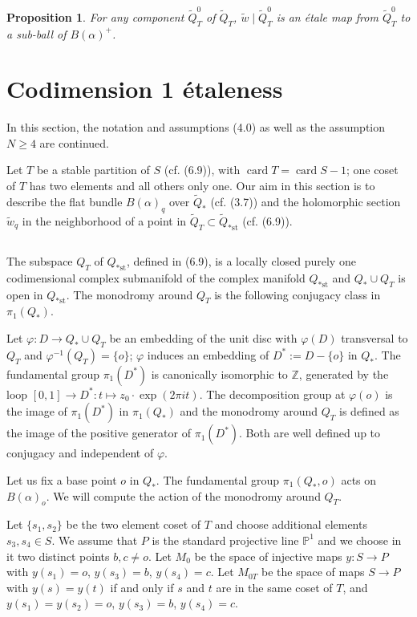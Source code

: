 \documentclass[12pt,a4paper]{article}
\theoremstyle{plain}
\newtheorem{proposition}[theorem]{Proposition}
\theoremstyle{definition}
\theoremstyle{remark}
\DeclareMathOperator{\card}{card}
\begin{document}
\begin{proposition}
\label{8.9}
For any component $\widetilde{Q}_T^0$ of $\widetilde{Q}_T$, $\widetilde{w} \mid \widetilde{Q}_T^0$ is an \'etale map from $\widetilde{Q}_T^0$ to a sub-ball of $B(\alpha)^+$.
\end{proposition}

\section{Codimension 1 \'etaleness}
\label{sec:9}

In this section, the notation and assumptions (4.0) as well as the assumption $N \geqslant 4$ are continued.

Let $T$ be a stable partition of $S$ (cf. (6.9)), with $\card T = \card S - 1$; one coset of $T$ has two elements and all others only one. Our aim in this section is to describe the flat bundle $B(\alpha)_q$ over $\widetilde{Q}_*$ (cf. (3.7)) and the holomorphic section $\widetilde{w}_q$ in the neighborhood of a point in $\widetilde{Q}_T \subset \widetilde{Q}_{*\text{st}}$ (cf. (6.9)).

\subsection{}
\label{9.1}

The subspace $Q_T$ of $Q_{*\text{st}}$, defined in (6.9), is a locally closed purely one codimensional complex submanifold of the complex manifold $Q_{*\text{st}}$ and $Q_* \cup Q_T$ is open in $Q_{*\text{st}}$. The monodromy around $Q_T$ is the following conjugacy class in $\pi_1(Q_*)$.

Let $\varphi : D \to Q_* \cup Q_T$ be an embedding of the unit disc with $\varphi(D)$ transversal to $Q_T$ and $\varphi^{-1}(Q_T) = \{o\}$; $\varphi$ induces an embedding of $D^* := D - \{o\}$ in $Q_*$. The fundamental group $\pi_1(D^*)$ is canonically isomorphic to $\mathbb{Z}$, generated by the loop $[0, 1] \to D^* : t \mapsto z_0 \cdot \exp(2\pi i t)$. The decomposition group at $\varphi(o)$ is the image of $\pi_1(D^*)$ in $\pi_1(Q_*)$ and the monodromy around $Q_T$ is defined as the image of the positive generator of $\pi_1(D^*)$. Both are well defined up to conjugacy and independent of $\varphi$.

Let us fix a base point $o$ in $Q_*$. The fundamental group $\pi_1(Q_*, o)$ acts on $B(\alpha)_o$. We will compute the action of the monodromy around $Q_T$.

Let $\{s_1, s_2\}$ be the two element coset of $T$ and choose additional elements $s_3, s_4 \in S$. We assume that $P$ is the standard projective line $\mathbb{P}^1$ and we choose in it two distinct points $b, c \neq o$. Let $M_0$ be the space of injective maps $y : S \to P$ with $y(s_1) = o$, $y(s_3) = b$, $y(s_4) = c$. Let $M_{0T}$ be the space of maps $S \to P$ with $y(s) = y(t)$ if and only if $s$ and $t$ are in the same coset of $T$, and $y(s_1) = y(s_2) = o$, $y(s_3) = b$, $y(s_4) = c$.
\end{document}
